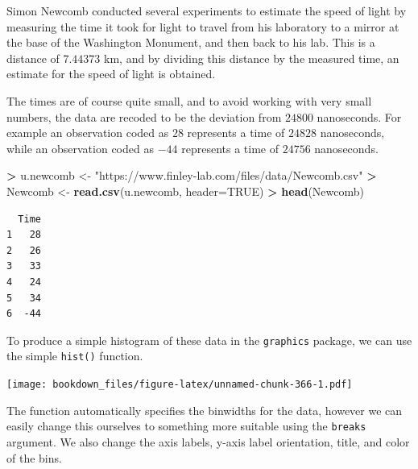 \documentclass[
]{krantz}
\makeatletter
\newenvironment{Shaded}{\begin{snugshade}}{\end{snugshade}}
\newcommand{\DataTypeTok}[1]{\textcolor[rgb]{0.27,0.27,0.27}{#1}}
\newcommand{\KeywordTok}[1]{\textcolor[rgb]{0.27,0.27,0.27}{\textbf{#1}}}
\newcommand{\NormalTok}[1]{#1}
\newcommand{\OperatorTok}[1]{\textcolor[rgb]{0.43,0.43,0.43}{\textbf{#1}}}
\newcommand{\OtherTok}[1]{\textcolor[rgb]{0.37,0.37,0.37}{#1}}
\newcommand{\StringTok}[1]{\textcolor[rgb]{0.5,0.5,0.5}{#1}}
\newenvironment{kframe}{%
\medskip{}
\setlength{\fboxsep}{.8em}
 \def\at@end@of@kframe{}%
 \ifinner\ifhmode%
  \def\at@end@of@kframe{\end{minipage}}%
  \begin{minipage}{\columnwidth}%
 \fi\fi%
 \def\FrameCommand##1{\hskip\@totalleftmargin \hskip-\fboxsep
 \colorbox{shadecolor}{##1}\hskip-\fboxsep
     \hskip-\linewidth \hskip-\@totalleftmargin \hskip\columnwidth}%
 \MakeFramed {\advance\hsize-\width
   \@totalleftmargin\z@ \linewidth\hsize
   \@setminipage}}%
 {\par\unskip\endMakeFramed%
 \at@end@of@kframe}
\renewenvironment{Shaded}{\begin{kframe}}{\end{kframe}}
\makeatother
\begin{document}
Simon Newcomb conducted several experiments to estimate the speed of light by measuring the time it took for light to travel from his laboratory to a mirror at the base of the Washington Monument, and then back to his lab. This is a distance of \(7.44373\) km, and by dividing this distance by the measured time, an estimate for the speed of light is obtained.

The times are of course quite small, and to avoid working with very small numbers, the data are recoded to be the deviation from \(24800\) nanoseconds. For example an observation coded as \(28\) represents a time of \(24828\) nanoseconds, while an observation coded as \(-44\) represents a time of \(24756\) nanoseconds.

\begin{Shaded}
\begin{Highlighting}[]
\OperatorTok{\textgreater{}}\StringTok{ }\NormalTok{u.newcomb \textless{}{-}}\StringTok{ "https://www.finley{-}lab.com/files/data/Newcomb.csv"}
\OperatorTok{\textgreater{}}\StringTok{ }\NormalTok{Newcomb \textless{}{-}}\StringTok{ }\KeywordTok{read.csv}\NormalTok{(u.newcomb, }\DataTypeTok{header=}\OtherTok{TRUE}\NormalTok{)}
\OperatorTok{\textgreater{}}\StringTok{ }\KeywordTok{head}\NormalTok{(Newcomb)}
\end{Highlighting}
\end{Shaded}

\begin{verbatim}
  Time
1   28
2   26
3   33
4   24
5   34
6  -44
\end{verbatim}

To produce a simple histogram of these data in the \texttt{graphics} package, we can use the simple \texttt{hist()} function.

\begin{Shaded}
\end{Shaded}

\texttt{[image: bookdown\_files/figure-latex/unnamed-chunk-366-1.pdf]}

The function automatically specifies the binwidths for the data, however we can easily change this ourselves to something more suitable using the \texttt{breaks} argument. We also change the axis labels, y-axis label orientation, title, and color of the bins.
\end{document}
